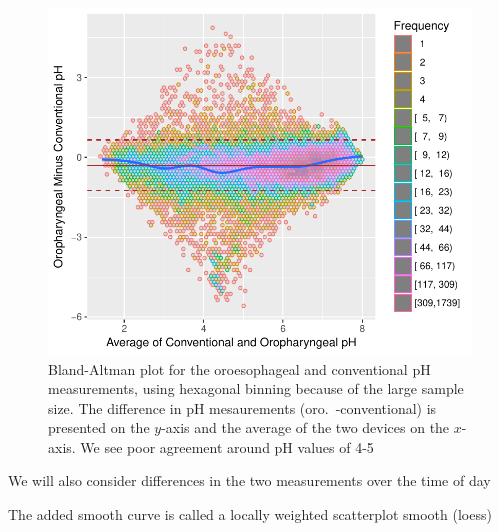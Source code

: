 \begin{Schunk}
\begin{figure}[htbp]

\centerline{\includegraphics[width=\maxwidth]{corr-baplot-1} }

\caption[Bland-Altman plot for 2 pH measurements]{Bland-Altman plot for the oroesophageal and conventional pH measurements, using hexagonal binning because of the large sample size.  The difference in pH mesaurements (oro.\ -conventional) is presented on the $y$-axis and the average of the two devices on the $x$-axis.  We see poor agreement around pH values of 4-5}\label{fig:corr-baplot}
\end{figure}
\end{Schunk}

\bi 
  \item We will also consider differences in the two measurements over the time of day
  \item The added smooth curve is called a locally weighted scatterplot smooth (loess)
\ei

